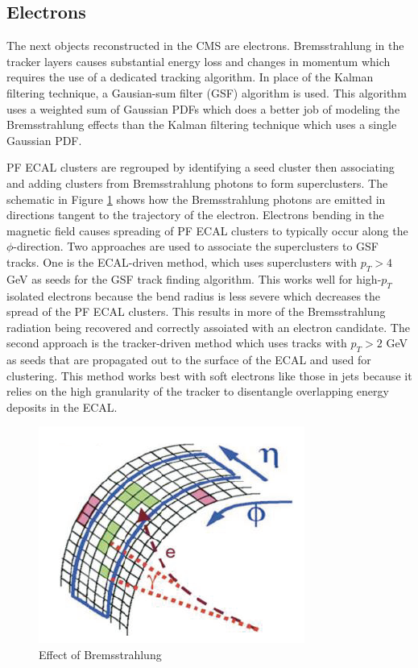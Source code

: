 \subsection{Electrons}
The next objects reconstructed in the CMS are electrons.  Bremsstrahlung in the tracker layers causes substantial energy loss and changes in momentum which requires the use of a dedicated tracking algorithm.  In place of the Kalman filtering technique, a Gausian-sum filter (GSF) algorithm is used.  This algorithm uses a weighted sum of Gaussian PDFs which does a better job of modeling the Bremsstrahlung effects than the Kalman filtering technique which uses a single Gaussian PDF.  

PF ECAL clusters are regrouped by identifying a seed cluster then associating and adding clusters from Bremsstrahlung photons to form superclusters.  The schematic in Figure \ref{fig:electrontracking} shows how the Bremsstrahlung photons are emitted in directions tangent to the trajectory of the electron.  Electrons bending in the magnetic field causes spreading of PF ECAL clusters to typically occur along the $\phi$-direction.  Two approaches are used to associate the superclusters to GSF tracks.  One is the ECAL-driven method, which uses superclusters with $p_T > 4$ GeV as seeds for the GSF track finding algorithm.  This works well for high-$p_T$ isolated electrons because the bend radius is less severe which decreases the spread of the PF ECAL clusters. This results in more of the Bremsstrahlung radiation being recovered and correctly assoiated with an electron candidate.  The second approach is the tracker-driven method which uses tracks with $p_T > 2$ GeV as seeds that are propagated out to the surface of the ECAL and used for clustering.  This method works best with soft electrons like those in jets because it relies on the high granularity of the tracker to disentangle overlapping energy deposits in the ECAL. \cite{Electrontracking:2715343}

\begin{figure}[h]
	\centering
	\includegraphics[width=0.4\linewidth]{Figures/electrontracking}
	\caption{Effect of Bremsstrahlung}
	\label{fig:electrontracking}
\end{figure}


